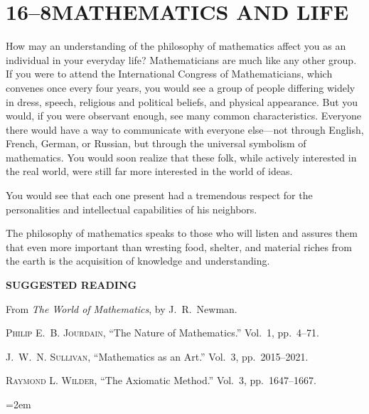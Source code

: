 \documentclass[11pt]{book}
\theoremstyle{bkplain}
\theoremstyle{XIplainnote}
\theoremstyle{bkplain}
\theoremstyle{bkplain}
\begin{document}
\section*{16--8\quad MATHEMATICS AND LIFE}

How may an understanding of the philosophy of mathematics affect you as an
individual in your everyday life? Mathematicians are much like any other
group. If you were to attend the International Congress of Mathematicians,
which convenes once every four years, you would see a group of people
differing widely in dress, speech, religious and political beliefs, and
physical appearance. But you would, if you were observant enough, see many
common characteristics. Everyone there would have a way to communicate with
everyone else---not through English, French, German, or Russian, but through
the universal symbolism of mathematics. You would soon realize that these
folk, while actively interested in the real world, were still far more
interested in the world of ideas.

You would see that each one present had a tremendous respect for the
personalities and intellectual capabilities of his neighbors.

The philosophy of mathematics speaks to those who will listen and assures them
that even more important than wresting food, shelter, and material riches from
the earth is the acquisition of knowledge and understanding.

\par\medskip
\begin{center}\bfseries SUGGESTED READING\end{center}
\par\nopagebreak\medskip

\noindent From \emph{The World of Mathematics}, by J.~R.~Newman.
\begingroup\raggedright
\begin{exlist}
\item \textsc{Philip} E.~B. \textsc{Jourdain}, ``The Nature of Mathematics.''
      Vol.~1, pp.~4--71.
\item J.~W.~N. \textsc{Sullivan}, ``Mathematics as an Art.''
      Vol.~3, pp.~2015--2021.
\item \textsc{Raymond} L. \textsc{Wilder}, ``The Axiomatic Method.''
      Vol.~3, pp.~1647--1667.
\end{exlist}
\endgroup
\clearpage
\setcounter{theorem}{0}\setcounter{definition}{0}\setcounter{construction}{0}\setcounter{exgroup}{0}\setcounter{footnote}{0}
\setcounter{chapter}{17}
\emergencystretch=2em
\end{document}
